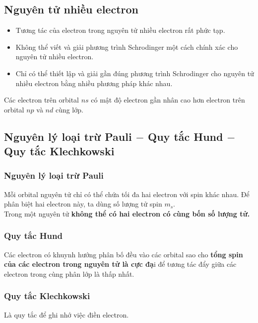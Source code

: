 \subsection{Nguyên tử nhiều electron}
\begin{itemize}
\item Tương tác của electron trong nguyên tử nhiều electron rất phức tạp.
\item Không thể viết và giải phương trình Schrodinger một cách chính xác cho nguyên tử nhiều electron.
\item Chỉ có thể thiết lập và giải gần đúng phương trình Schrodinger cho nguyên tử nhiều electron bằng nhiều phương pháp khác nhau.
\end{itemize}
Các electron trên orbital $ns$ có mật độ electron gần nhân cao hơn electron trên orbital $np$ và $nd$ cùng lớp.
\subsection{Nguyên lý loại trừ Pauli $-$ Quy tắc Hund $-$ Quy tắc Klechkowski}
\subsubsection{Nguyên lý loại trừ Pauli}
Mỗi orbital nguyên tử chỉ có thể chứa tối đa hai electron với spin khác nhau. Để phân biệt hai electron này, ta dùng số lượng tử spin $m_s.$\\
Trong một nguyên tử \textbf{không thể có hai electron có cùng bốn số lượng tử.}
\subsubsection{Quy tắc Hund}
Các electron có khuynh hướng phân bố đều vào các orbital sao cho \textbf{tổng spin của các electron trong nguyên tử là cực đạ}i để tương tác đẩy giữa các electron trong cùng phân lớp là thấp nhất.
\subsubsection{Quy tắc Klechkowski}
Là quy tắc để ghi nhớ việc điền electron.